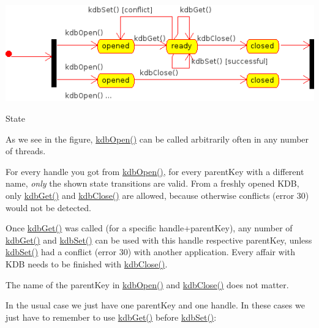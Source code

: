 \begin{DoxyImage}
\includegraphics{state.png}
\caption{State}
\end{DoxyImage}
 As we see in the figure, \hyperlink{group__kdb_ga6808defe5870f328dd17910aacbdc6ca}{kdb\+Open()} can be called arbitrarily often in any number of threads.

For every handle you got from \hyperlink{group__kdb_ga6808defe5870f328dd17910aacbdc6ca}{kdb\+Open()}, for every parent\+Key with a different name, {\itshape only} the shown state transitions are valid. From a freshly opened K\+D\+B, only \hyperlink{group__kdb_ga28e385fd9cb7ccfe0b2f1ed2f62453a1}{kdb\+Get()} and \hyperlink{group__kdb_gadb54dc9fda17ee07deb9444df745c96f}{kdb\+Close()} are allowed, because otherwise conflicts (error 30) would not be detected.

Once \hyperlink{group__kdb_ga28e385fd9cb7ccfe0b2f1ed2f62453a1}{kdb\+Get()} was called (for a specific handle+parent\+Key), any number of \hyperlink{group__kdb_ga28e385fd9cb7ccfe0b2f1ed2f62453a1}{kdb\+Get()} and \hyperlink{group__kdb_ga11436b058408f83d303ca5e996832bcf}{kdb\+Set()} can be used with this handle respective parent\+Key, unless \hyperlink{group__kdb_ga11436b058408f83d303ca5e996832bcf}{kdb\+Set()} had a conflict (error 30) with another application. Every affair with K\+D\+B needs to be finished with \hyperlink{group__kdb_gadb54dc9fda17ee07deb9444df745c96f}{kdb\+Close()}.

The name of the parent\+Key in \hyperlink{group__kdb_ga6808defe5870f328dd17910aacbdc6ca}{kdb\+Open()} and \hyperlink{group__kdb_gadb54dc9fda17ee07deb9444df745c96f}{kdb\+Close()} does not matter.

In the usual case we just have one parent\+Key and one handle. In these cases we just have to remember to use \hyperlink{group__kdb_ga28e385fd9cb7ccfe0b2f1ed2f62453a1}{kdb\+Get()} before \hyperlink{group__kdb_ga11436b058408f83d303ca5e996832bcf}{kdb\+Set()}\+:


